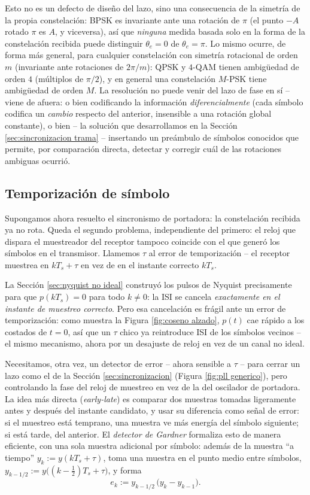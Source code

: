 Esto no es un defecto de diseño del lazo, sino una consecuencia de la simetría de la propia constelación: BPSK es invariante ante una rotación de $\pi$ (el punto $-A$ rotado $\pi$ es $A$, y viceversa), así que \emph{ninguna} medida basada solo en la forma de la constelación recibida puede distinguir $\theta_e=0$ de $\theta_e=\pi$. Lo mismo ocurre, de forma más general, para cualquier constelación con simetría rotacional de orden $m$ (invariante ante rotaciones de $2\pi/m$): QPSK y $4$-QAM tienen ambigüedad de orden $4$ (múltiplos de $\pi/2$), y en general una constelación $M$-PSK tiene ambigüedad de orden $M$. La resolución no puede venir del lazo de fase en sí -- viene de afuera: o bien codificando la información \emph{diferencialmente} (cada símbolo codifica un \emph{cambio} respecto del anterior, insensible a una rotación global constante), o bien -- la solución que desarrollamos en la Sección \ref{sec:sincronizacion trama} -- insertando un preámbulo de símbolos conocidos que permite, por comparación directa, detectar y corregir cuál de las rotaciones ambiguas ocurrió.

\subsection*{Temporización de símbolo}

Supongamos ahora resuelto el sincronismo de portadora: la constelación recibida ya no rota. Queda el segundo problema, independiente del primero: el reloj que dispara el muestreador del receptor tampoco coincide con el que generó los símbolos en el transmisor. Llamemos $\tau$ al error de temporización -- el receptor muestrea en $kT_s+\tau$ en vez de en el instante correcto $kT_s$.

La Sección \ref{sec:nyquist no ideal} construyó los pulsos de Nyquist precisamente para que $p(kT_s)=0$ para todo $k\neq 0$: la ISI se cancela \emph{exactamente en el instante de muestreo correcto}. Pero esa cancelación es frágil ante un error de temporización: como muestra la Figura \ref{fig:coseno alzado}, $p(t)$ cae rápido a los costados de $t=0$, así que un $\tau$ chico ya reintroduce ISI de los símbolos vecinos -- el mismo mecanismo, ahora por un desajuste de reloj en vez de un canal no ideal.

Necesitamos, otra vez, un detector de error -- ahora sensible a $\tau$ -- para cerrar un lazo como el de la Sección \ref{sec:sincronizacion} (Figura \ref{fig:pll generico}), pero controlando la fase del reloj de muestreo en vez de la del oscilador de portadora. La idea más directa (\emph{early-late}) es comparar dos muestras tomadas ligeramente antes y después del instante candidato, y usar su diferencia como señal de error: si el muestreo está temprano, una muestra ve más energía del símbolo siguiente; si está tarde, del anterior. El \emph{detector de Gardner} formaliza esto de manera eficiente, con una sola muestra adicional por símbolo: además de la muestra ``a tiempo'' $y_k:=y(kT_s+\tau)$, toma una muestra en el punto medio entre símbolos, $y_{k-1/2}:=y\big((k-\tfrac12)T_s+\tau\big)$, y forma
\begin{equation}\label{eq:error gardner}
    e_k := y_{k-1/2}\,\big(y_k - y_{k-1}\big).
\end{equation}

